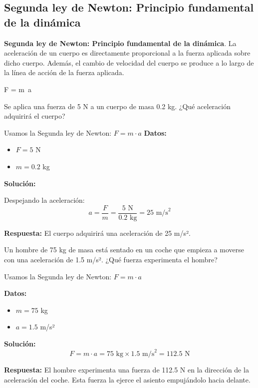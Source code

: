 \subsection{Segunda ley de Newton: Principio fundamental de la dinámica}

\begin{dBox}
    \textbf{Segunda ley de Newton: Principio fundamental de la dinámica}. La aceleración de un cuerpo es directamente proporcional a la fuerza aplicada sobre dicho cuerpo. Además, el cambio de velocidad del cuerpo se produce a lo largo de la línea de acción de la fuerza aplicada.
    \begin{centeredequation}
        \Sigma F = m\ a
    \end{centeredequation}
\end{dBox}

\begin{exercise}
    Se aplica una fuerza de 5 N a un cuerpo de masa 0.2 kg.
    ¿Qué aceleración adquirirá el cuerpo?

    \begin{solu}
        Usamos la Segunda ley de Newton: $F = m \cdot a$
        \textbf{Datos:}
        \begin{itemize}
            \item $F = 5$ N
            \item $m = 0.2$ kg
        \end{itemize}

        \textbf{Solución:}

        Despejando la aceleración:
        $$a = \frac{F}{m} = \frac{5\text{ N}}{0.2\text{ kg}} = 25\text{ m/s}^2$$

        \textbf{Respuesta:} El cuerpo adquirirá una aceleración de 25 m/s².
    \end{solu}
\end{exercise}

\begin{exercise}
    Un hombre de 75 kg de masa está sentado en un coche que empieza a moverse con una aceleración de 1.5 m/s².
    ¿Qué fuerza experimenta el hombre?

    \begin{solu}
        Usamos la Segunda ley de Newton: $F = m \cdot a$

        \textbf{Datos:}
        \begin{itemize}
            \item $m = 75$ kg
            \item $a = 1.5$ m/s²
        \end{itemize}

        \textbf{Solución:}
        $$F = m \cdot a = 75\text{ kg} \times 1.5\text{ m/s}^2 = 112.5\text{ N}$$

        \textbf{Respuesta:} El hombre experimenta una fuerza de 112.5 N en la dirección de la aceleración del coche. Esta fuerza la ejerce el asiento empujándolo hacia delante.
    \end{solu}
\end{exercise}

